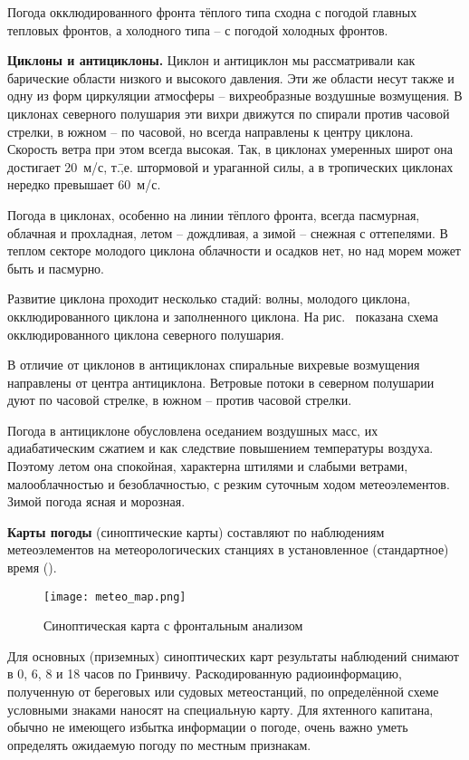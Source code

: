 Погода окклюдированного фронта тёплого типа сходна с погодой главных
тепловых фронтов, а холодного типа \--- с погодой холодных фронтов.

\textbf{Циклоны и антициклоны.} Циклон
и антициклон мы рассматривали как барические области низкого и
высокого давления. Эти же области несут также и одну из форм
циркуляции атмосферы \--- вихреобразные воздушные возмущения. В
циклонах северного полушария эти вихри движутся по спирали против
часовой стрелки, в южном \--- по часовой, но всегда направлены к
центру циклона. Скорость ветра при этом всегда высокая. Так, в
циклонах умеренных широт она достигает 20~м/с,
т.\=,е. штормовой и ураганной силы, а в тропических циклонах нередко
превышает 60~м/с.

Погода в циклонах, особенно на линии тёплого фронта, всегда пасмурная,
облачная и прохладная, летом \--- дождливая, а зимой \--- снежная с
оттепелями. В теплом секторе молодого циклона облачности и осадков
нет, но над морем может быть и пасмурно.

Развитие циклона проходит несколько стадий: волны, молодого циклона,
окклюдированного циклона и заполненного циклона. На рис.~
показана схема окклюдированного циклона северного полушария.

В отличие от циклонов в антициклонах спиральные вихревые возмущения
направлены от центра антициклона. Ветровые потоки в северном полушарии
дуют по часовой стрелке, в южном \--- против часовой стрелки.

Погода в антициклоне обусловлена оседанием воздушных масс, их
адиабатическим сжатием и как следствие повышением температуры
воздуха. Поэтому летом она спокойная, характерна штилями и слабыми
ветрами, малооблачностью и безоблачностью, с резким суточным ходом
метеоэлементов. Зимой погода ясная и морозная.

\textbf{Карты погоды} (синоптические карты)
 составляют по
наблюдениям метеоэлементов на метеорологических станциях в
установленное (стандартное) время ().

\begin{figure*}[htb]
  \centering{}
  \texttt{[image: meteo\_map.png]}
  \caption{Синоптическая карта с фронтальным анализом}
  \label{fig:meteo_map}
\end{figure*}

Для основных (приземных) синоптических карт результаты наблюдений
снимают в 0, 6, 8 и 18 часов по Гринвичу. Раскодированную
радиоинформацию, полученную от береговых или судовых метеостанций, по
определённой схеме условными знаками наносят на специальную карту. Для
яхтенного капитана, обычно не имеющего избытка информации о погоде,
очень важно уметь определять ожидаемую погоду по местным признакам.


